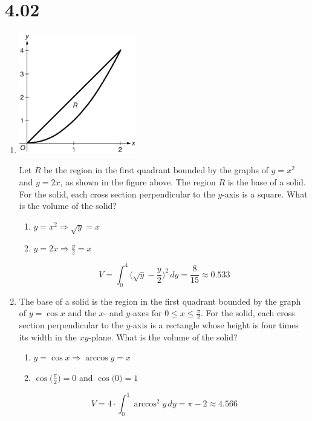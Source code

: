 \documentclass[12pt]{article}
\begin{document}
\section*{4.02}
\begin{enumerate}
    \item 
    \begin{center}
        \includegraphics[width=2in]{4.021.png}
    \end{center}
    Let $R$ be the region in the first quadrant bounded by the graphs of $y=x^2$ and $y=2x$, as shown in the figure above. The region $R$ is the base of a solid. For the solid, each cross section perpendicular to the $y$-axis is a square. What is the volume of the solid?
    \begin{enumerate}
        \item $y=x^2 \Longrightarrow \sqrt{y}=x$
        \item $y=2x \Longrightarrow \frac{y}{2}=x$
    \end{enumerate}
    $$V=\int_{0}^{4} \biggr( \sqrt{y} - \frac{y}{2}\biggr)^2 \, dy = \frac{8}{15} \approx \boxed{0.533}$$
    \item The base of a solid is the region in the first quadrant bounded by the graph of $y=\cos x$ and the $x$- and $y$-axes for $0 \leq x \leq \frac{\pi}{2}$. For the solid, each cross section perpendicular to the $y$-axis is a rectangle whose height is four times its width in the $xy$-plane. What is the volume of the solid?
    \begin{enumerate}
        \item $y=\cos x \Longrightarrow \arccos y = x$
        \item $\cos \big(\frac{\pi}{2}\big) = 0$ and $\cos \big(0\big)=1$
    \end{enumerate}
    $$V=4 \cdot \int_{0}^{1} \arccos^2 y \, dy =\pi-2 \approx \boxed{4.566}$$


\end{enumerate}
\end{document}
